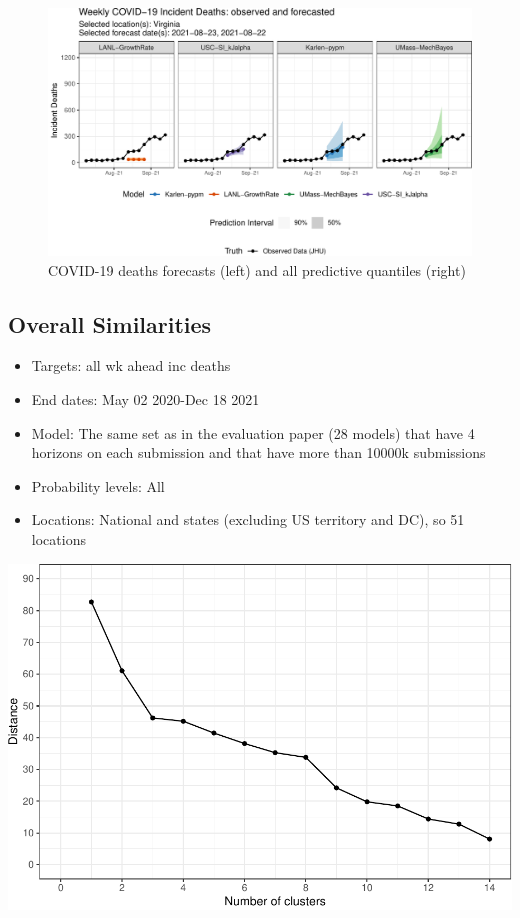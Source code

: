 \documentclass[
]{article}
\providecommand{\tightlist}{%
  \setlength{\itemsep}{0pt}\setlength{\parskip}{0pt}}
\begin{document}
\begin{figure}

{\centering \includegraphics{sim_analysis_5_files/figure-latex/type_leg-1} 

}

\caption{COVID-19 deaths forecasts (left) and all predictive quantiles (right)}\label{fig:type_leg}
\end{figure}

\hypertarget{overall-similarities}{%
\subsection{Overall Similarities}\label{overall-similarities}}

\begin{itemize}
\tightlist
\item
  Targets: all wk ahead inc deaths
\item
  End dates: May 02 2020-Dec 18 2021
\item
  Model: The same set as in the evaluation paper (28 models) that have 4
  horizons on each submission and that have more than 10000k submissions
\item
  Probability levels: All
\item
  Locations: National and states (excluding US territory and DC), so 51
  locations
\end{itemize}

\includegraphics{sim_analysis_5_files/figure-latex/elbowp-1.pdf}
\end{document}
